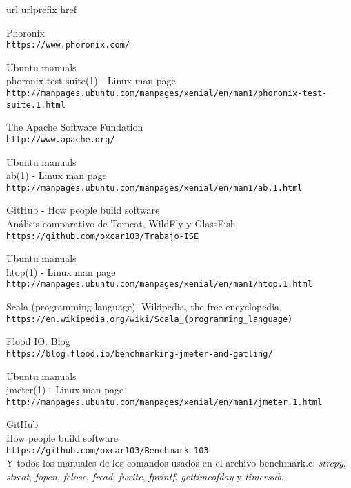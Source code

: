 \begin{thebibliography}{10}
\expandafter\ifx\csname url\endcsname\relax
  \def\url#1{\texttt{#1}}\fi
\expandafter\ifx\csname urlprefix\endcsname\relax\def\urlprefix{URL }\fi
\expandafter\ifx\csname href\endcsname\relax
  \def\href#1#2{#2} \def\path#1{#1}\fi

Phoronix\\
  \url{https://www.phoronix.com/}

Ubuntu manuals\\
phoronix-test-suite(1) - Linux man page\\
  \url{http://manpages.ubuntu.com/manpages/xenial/en/man1/phoronix-test-suite.1.html}

The Apache Software Fundation\\
  \url{http://www.apache.org/}

Ubuntu manuals\\
ab(1) - Linux man page\\
  \url{http://manpages.ubuntu.com/manpages/xenial/en/man1/ab.1.html}

GitHub - How people build software\\
Análisis comparativo de Tomcat, WildFly y GlassFish\\
  \url{https://github.com/oxcar103/Trabajo-ISE}

Ubuntu manuals\\
htop(1) - Linux man page\\
  \url{http://manpages.ubuntu.com/manpages/xenial/en/man1/htop.1.html}

Scala (programming language). Wikipedia, the free encyclopedia.\\
  \url{https://en.wikipedia.org/wiki/Scala_(programming_language)}

Flood IO. Blog\\
  \url{https://blog.flood.io/benchmarking-jmeter-and-gatling/}

Ubuntu manuals\\
jmeter(1) - Linux man page\\
  \url{http://manpages.ubuntu.com/manpages/xenial/en/man1/jmeter.1.html}

GitHub\\
How people build software\\
  \url{https://github.com/oxcar103/Benchmark-103}\\
Y todos los manuales de los comandos usados en el archivo benchmark.c: \textit{strcpy}\cite{man_strcpy},
\textit{strcat}\cite{man_strcat}, \textit{fopen}\cite{man_fopen}, \textit{fclose}\cite{man_fclose},
\textit{fread}\cite{man_fread}, \textit{fwrite}\cite{man_fwrite}, \textit{fprintf}\cite{man_fprintf},
\textit{gettimeofday}\cite{man_gettimeofday} y \textit{timersub}\cite{man_timersub}.


\end{thebibliography}
